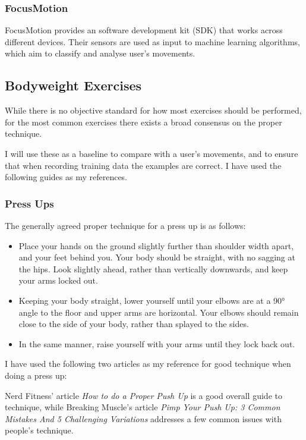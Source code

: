\documentclass[a4paper]{article}
\begin{document}
\subsubsection{FocusMotion}

FocusMotion\cite{bgref15} provides an software development kit (SDK) that works across different devices. Their sensors are used as input to machine learning algorithms, which aim to classify and analyse user's movements.

\subsection{Bodyweight Exercises}%
\label{subsec:bg_exercises}

While there is no objective standard for how most exercises should be performed, for the most common exercises there exists a broad consensus on the proper technique.

I will use these as a baseline to compare with a user's movements, and to ensure that when recording training data the examples are correct. I have used the following guides as my references.

\subsubsection{Press Ups}

The generally agreed proper technique for a press up is as follows:

\begin{itemize}
    \item Place your hands on the ground slightly further than shoulder width apart, and your feet behind you. Your body should be straight, with no sagging at the hips. Look slightly ahead, rather than vertically downwards, and keep your arms locked out.
    \item Keeping your body straight, lower yourself until your elbows are at a 90° angle to the floor and upper arms are horizontal. Your elbows should remain close to the side of your body, rather than splayed to the sides.
    \item In the same manner, raise yourself with your arms until they lock back out.
\end{itemize}

I have used the following two articles as my reference for good technique when doing a press up:

Nerd Fitness' article \textit{How to do a Proper Push Up}\cite{bgref16}
is a good overall guide to technique, while Breaking Muscle's article \textit{Pimp Your Push Up: 3 Common Mistakes And 5 Challenging Variations}\cite{bgref17} addresses a few common issues with people's technique.
\end{document}
